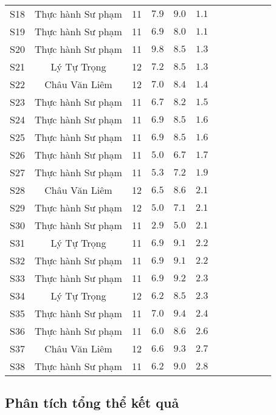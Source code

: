 \begin{longtable}{ScSlScScScSc}
	S18 & Thực hành Sư phạm & 11 & $7.9$ & $9.0$ & $1.1$ \\
	S19 & Thực hành Sư phạm & 11 & $6.9$ & $8.0$ & $1.1$ \\

	S20 & Thực hành Sư phạm & 11 & $9.8$ & $8.5$ & $1.3$ \\
	S21 & Lý Tự Trọng       & 12 & $7.2$ & $8.5$ & $1.3$ \\

	S22 & Châu Văn Liêm     & 12 & $7.0$ & $8.4$ & $1.4$ \\
	S23 & Thực hành Sư phạm & 11 & $6.7$ & $8.2$ & $1.5$ \\

	S24 & Thực hành Sư phạm & 11 & $6.9$ & $8.5$ & $1.6$ \\
	S25 & Thực hành Sư phạm & 11 & $6.9$ & $8.5$ & $1.6$ \\

	S26 & Thực hành Sư phạm & 11 & $5.0$ & $6.7$ & $1.7$ \\
	S27 & Thực hành Sư phạm & 11 & $5.3$ & $7.2$ & $1.9$ \\

	S28 & Châu Văn Liêm     & 12 & $6.5$ & $8.6$ & $2.1$ \\
	S29 & Thực hành Sư phạm & 12 & $5.0$ & $7.1$ & $2.1$ \\
	S30 & Thực hành Sư phạm & 11 & $2.9$ & $5.0$ & $2.1$ \\

	S31 & Lý Tự Trọng       & 11 & $6.9$ & $9.1$ & $2.2$ \\
	S32 & Thực hành Sư phạm & 11 & $6.9$ & $9.1$ & $2.2$ \\

	S33 & Thực hành Sư phạm & 11 & $6.9$ & $9.2$ & $2.3$ \\
	S34 & Lý Tự Trọng       & 12 & $6.2$ & $8.5$ & $2.3$ \\

	S35 & Thực hành Sư phạm & 11 & $7.0$ & $9.4$ & $2.4$ \\
	S36 & Thực hành Sư phạm & 11 & $6.0$ & $8.6$ & $2.6$ \\
	S37 & Châu Văn Liêm     & 12 & $6.6$ & $9.3$ & $2.7$ \\
	S38 & Thực hành Sư phạm & 11 & $6.2$ & $9.0$ & $2.8$ \\
\end{longtable}\par

\subsection{Phân tích tổng thể kết quả}

